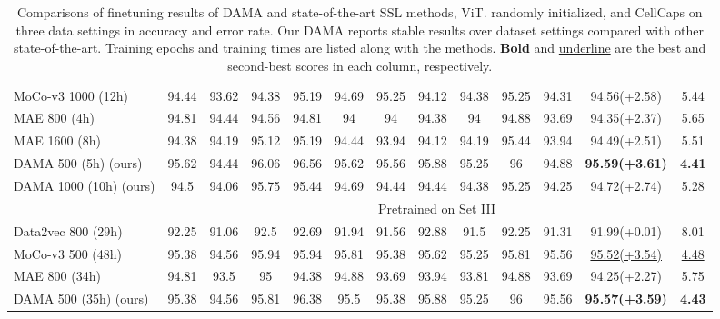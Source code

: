 \documentclass[10pt,twocolumn,letterpaper]{article}
\begin{document}
\begin{table*}[t]
\begin{tabular}{lcccccccccccc}
MoCo-v3 \cite{mocov3} 1000 (12h)      & 94.44 & 93.62 & 94.38 & 95.19 & 94.69 & 95.25 & 94.12 & 94.38 & 95.25 & 94.31 & 94.56(+2.58) &    5.44     \\
MAE \cite{mae} 800 (4h)         & 94.81 & 94.44 & 94.56 & 94.81 & 94    & 94    & 94.38 & 94    & 94.88 & 93.69 & 94.35(+2.37)  &   5.65    \\
MAE \cite{mae} 1600 (8h)        & 94.38 & 94.19 & 95.12 & 95.19 & 94.44 & 93.94 & 94.12 & 94.19 & 95.44 & 93.94 & 94.49(+2.51)  &   5.51    \\
DAMA 500 (5h) (ours) & 95.62	&94.44&	96.06&	96.56&	95.62&	95.56&	95.88&	95.25&	96&	94.88&	\textbf{95.59(+3.61)} & \textbf{4.41}\\
DAMA 1000 (10h) (ours)     & 94.5  & 94.06 & 95.75 & 95.44 & 94.69 & 94.44 & 94.44 & 94.38 & 95.25 & 94.25 & 94.72(+2.74)  &   5.28     \\ 
\hline
                      & \multicolumn{12}{c}{Pretrained on Set III}                                                        \\ \hline
Data2vec \cite{data2vec} 800 (29h)        & 92.25 & 91.06 & 92.5  & 92.69 & 91.94 & 91.56 & 92.88 & 91.5  & 92.25 & 91.31 & 91.99(+0.01)  &  8.01     \\
MoCo-v3 \cite{mocov3} 500 (48h)            & 95.38 & 94.56 & 95.94 & 95.94 & 95.81 & 95.38 & 95.62 & 95.25 & 95.81 & 95.56 & \underline{95.52(+3.54)} &  \underline{4.48} \\
MAE \cite{mae} 800 (34h)             & 94.81 & 93.5  & 95    & 94.38 & 94.88 & 93.69 & 93.94 & 93.81 & 94.88 & 93.69 & 94.25(+2.27)  &  5.75     \\
DAMA 500 (35h) (ours) &95.38&	94.56&	95.81&	96.38&	95.5&	95.38&	95.88&	95.25&	96&	95.56&	\textbf{95.57(+3.59)}& \textbf{4.43} \\ \hline
\end{tabular}
\caption{Comparisons of finetuning results of DAMA and state-of-the-art SSL methods, ViT. randomly initialized, and CellCaps \cite{maric2021whole} on three data settings in accuracy and error rate. Our DAMA reports stable results over dataset settings compared with other state-of-the-art. Training epochs and training times are listed along with the methods. \textbf{Bold} and \underline{underline} are the {best} and second-best scores in each column, respectively.}
\label{tab:sota}
\end{table*}
\end{document}
